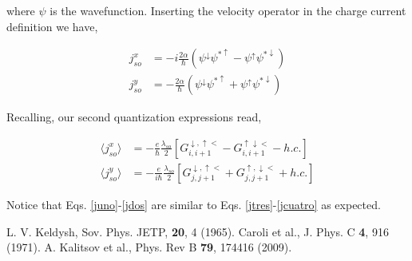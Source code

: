 \documentclass[10pt,prb,showpacs,amssymb,floatfix]{revtex4-1}
\newcommand{\dna}{\downarrow}
\newcommand{\upa}{\uparrow}
\newcommand{\alp}{\alpha}
\newcommand{\lam}{\lambda}
\begin{document}
where $\psi$ is the wavefunction. Inserting the velocity operator in the charge current definition we have,

\begin{align}
\label{juno}
j^x_{so} &= -i\frac{2\alp}{\hbar} (\psi^\dna\psi^{*\upa} - \psi^\upa\psi^{*\dna}) \\
j^y_{so} &= -\frac{2\alp}{\hbar} (\psi^\dna\psi^{*\upa}+\psi^\upa\psi^{*\dna})
\label{jdos}
\end{align}
 
 Recalling, our second quantization expressions read,
 
 \begin{align}
 \label{jtres}
\langle j^{x}_{so}\rangle &= -\frac{e}{\hbar}\frac{\lam_{so}}{2} [G^{\dna,\upa<}_{i,i+1} -G^{\upa\dna<}_{i,i+1}   - h.c.] \\
\langle j^{y}_{so}\rangle &= -\frac{e}{i\hbar} \frac{\lam_{so}}{2} [G^{\dna,\upa<}_{j,j+1} + G^{\upa,\dna<}_{j,j+1}+h.c.] 
 \label{jcuatro}
\end{align}

Notice that Eqs. \eqref{juno}-\eqref{jdos} are similar to Eqs. \eqref{jtres}-\eqref{jcuatro} as expected.
 

\begin{thebibliography}{999}
L. V. Keldysh, Sov. Phys. JETP, {\bf 20}, 4 (1965).
Caroli et al., J. Phys. C {\bf 4}, 916 (1971).
A. Kalitsov et al., Phys. Rev B {\bf 79}, 174416 (2009).
\end{thebibliography}
\end{document}

